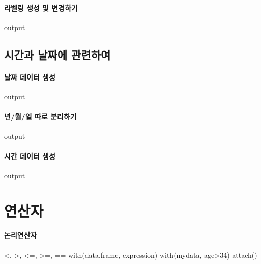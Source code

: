 \documentclass{report}
\begin{document}
\paragraph{라벨링 생성 및 변경하기}
\begin{Schunk}
\begin{Soutput}
output
\end{Soutput}
\end{Schunk}


\subsection{시간과 날짜에 관련하여}

\paragraph{날짜 데이터 생성}
\begin{Schunk}
\begin{Soutput}
output
\end{Soutput}
\end{Schunk}

\paragraph{년/월/일 따로 분리하기}
\begin{Schunk}
\begin{Soutput}
output
\end{Soutput}
\end{Schunk}

\paragraph{시간 데이터 생성}
\begin{Schunk}
\begin{Soutput}
output
\end{Soutput}
\end{Schunk}


\section{연산자}
\paragraph{논리연산자}
\begin{Schunk}
\begin{Soutput}
<, >, <=, >=, ==
with(data.frame, expression)
with(mydata, age>34)
attach()

\end{Soutput}
\end{Schunk}
\end{document}
